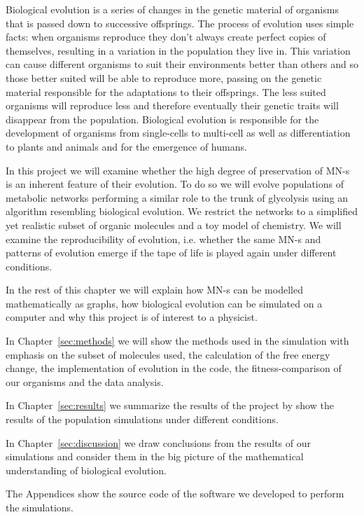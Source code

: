 \documentclass[a4paper,12pt]{article}
\begin{document}
	Biological evolution is a series of changes in the genetic material of organisms that is passed down to successive offsprings. The process of evolution uses simple facts: when organisms reproduce they don't always create perfect copies of themselves, resulting in a variation in the population they live in. This variation can cause different organisms to suit their environments better than others and so those better suited will be able to reproduce more, passing on the genetic material responsible for the adaptations to their offsprings. The less suited organisms will reproduce less and therefore eventually their genetic traits will disappear from the population. 
	 Biological evolution is responsible for the development of organisms from single-cells to multi-cell as well as differentiation to plants and animals and for the emergence of humans. 



	In this project we will examine whether the high degree of preservation of MN-s is an inherent feature of their evolution. To do so we will evolve populations of metabolic networks performing a similar role to the trunk of glycolysis using an algorithm resembling biological evolution. We restrict the networks to a simplified yet realistic subset of organic molecules and a toy model of chemistry. We will examine the reproducibility of evolution, i.e. whether the same MN-s and patterns of evolution emerge if the tape of life is played again under different conditions. 

	In the rest of this chapter we will explain how MN-s can be modelled mathematically as graphs, how biological evolution can be simulated on a computer and why this project is of interest to a physicist.

	In Chapter~\ref{sec:methods} we will show the methods used in the simulation with emphasis on the subset of molecules used, the calculation of the free energy change, the implementation of evolution in the code, the fitness-comparison of our organisms and the data analysis. 

	In Chapter~\ref{sec:results} we summarize the results of the project by show the results of the population simulations under different conditions.


	In Chapter~\ref{sec:discussion} we draw conclusions from the results of our simulations and consider them in the big picture of the mathematical understanding of biological evolution. 

	The Appendices show the source code of the software we developed to perform the simulations. 
	
\end{document}
